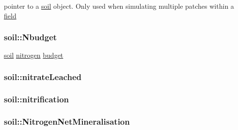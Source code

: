 pointer to a \hyperlink{classsoil}{soil} object. Only used when simulating multiple patches within a \hyperlink{classfield}{field} \hypertarget{classsoil_addf9abd98e1b4678c37c714b49045f79}{
\subsubsection[{Nbudget}]{ {\bf soil::Nbudget}}}
\label{classsoil_addf9abd98e1b4678c37c714b49045f79}


\hyperlink{classsoil}{soil} \hyperlink{classnitrogen}{nitrogen} \hyperlink{classbudget}{budget} \hypertarget{classsoil_a6d11057be5710fe4f12a148abccc30eb}{
\subsubsection[{nitrateLeached}]{ {\bf soil::nitrateLeached}}}
\label{classsoil_a6d11057be5710fe4f12a148abccc30eb}
\hypertarget{classsoil_a9b86d97fc4356ee0b07bbb78f67484c8}{
\subsubsection[{nitrification}]{ {\bf soil::nitrification}}}
\label{classsoil_a9b86d97fc4356ee0b07bbb78f67484c8}
\hypertarget{classsoil_a7bd29a49ff933e84c22b9fe2753cc2fe}{
\subsubsection[{NitrogenNetMineralisation}]{ {\bf soil::NitrogenNetMineralisation}}}
\label{classsoil_a7bd29a49ff933e84c22b9fe2753cc2fe}
